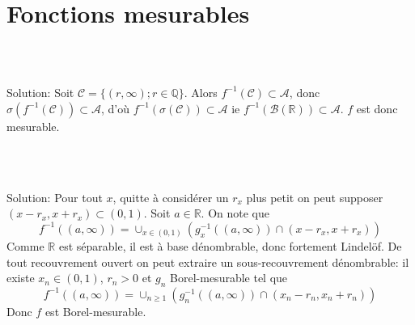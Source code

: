 \documentclass{report}
\begin{document}
\section{Fonctions mesurables}

\subsection{} \\ \\

Solution: Soit $\mathcal C = \{(r,\infty); r\in \mathbb Q\}$. Alors $f^{-1}(\mathcal C)\subset \mathcal A$, donc $\sigma(f^{-1}(\mathcal C))\subset \mathcal A$, d'où $f^{-1}(\sigma(\mathcal C)) \subset \mathcal A$ ie $f^{-1}(\mathcal B(\mathbb R)) \subset \mathcal A$. $f$ est donc mesurable.

\subsection{} \\\\

Solution: Pour tout $x$, quitte à considérer un $r_x$ plus petit on peut supposer $(x-r_x,x+r_x)\subset (0,1)$. Soit $a\in \mathbb R$. On note que $$f^{-1}((a,\infty)) = \cup_{x\in (0,1)}(g_x^{-1}((a,\infty))\cap (x-r_x,x+r_x))$$ Comme $\mathbb R$ est séparable, il est à base dénombrable, donc fortement Lindelöf. De tout recouvrement ouvert on peut extraire un sous-recouvrement dénombrable: il existe $x_n\in (0,1)$, $r_n>0$ et $g_n$ Borel-mesurable tel que $$f^{-1}((a,\infty)) = \cup_{n\geq 1}(g_n^{-1}((a,\infty))\cap (x_n-r_n,x_n+r_n))$$
Donc $f$ est Borel-mesurable.

\subsection{} \\ \\
\end{document}
